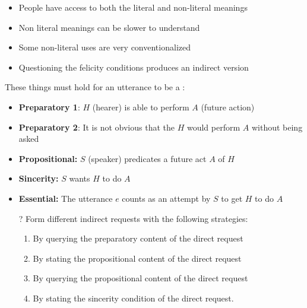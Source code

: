 \documentclass[a4paper,landscape,headrule,footrule,xetex]{foils}
\begin{document}
\begin{exe}
  \ex
  \begin{xlist}
    \ex {}
    \ex {}
  \end{xlist}
  \ex 
  \begin{xlist}
    \ex {}
    \ex {}
  \end{xlist}
  \ex
  \begin{xlist}
    \ex {}
    \ex {}
  \end{xlist}
\end{exe}
\begin{itemize}
\item People have access to both the literal and non-literal meanings
\item Non literal meanings can be slower to understand
\item Some non-literal uses are very conventionalized 
  \\  \into {}
\item Questioning the felicity conditions produces an indirect version
\end{itemize}


These things must hold for an utterance to be a :
\begin{itemize}
\item \textbf{Preparatory 1}: $H$ (hearer) is able to perform  $A$ (future action)
\item \textbf{Preparatory 2}: It is not obvious that the $H$ would perform $A$  without being asked
\item \textbf{Propositional:} $S$ (speaker) predicates a future act $A$ of $H$
\item \textbf{Sincerity:}  $S$ wants $H$ to do $A$ 
\item \textbf{Essential:} The utterance $e$ counts as an attempt by $S$ to get $H$ to do $A$
\end{itemize}


\begin{itemize}
\item[?]  Form different indirect requests with the following strategies:\task
  \begin{enumerate}
  \item By querying the preparatory content of the direct request
  \item By stating the  propositional content of the direct request
  \item By querying the propositional content of the direct request
  \item By stating the sincerity condition of the direct request.
  \end{enumerate}

\end{itemize}
\end{document}
